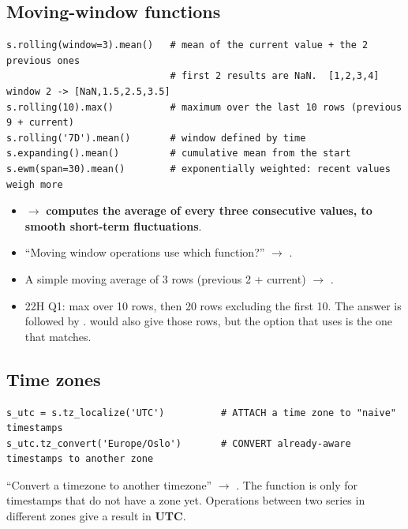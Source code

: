 \subsection{Moving-window functions}
\begin{codebox}
\begin{Verbatim}
s.rolling(window=3).mean()   # mean of the current value + the 2 previous ones
                             # first 2 results are NaN.  [1,2,3,4] window 2 -> [NaN,1.5,2.5,3.5]
s.rolling(10).max()          # maximum over the last 10 rows (previous 9 + current)
s.rolling('7D').mean()       # window defined by time
s.expanding().mean()         # cumulative mean from the start
s.ewm(span=30).mean()        # exponentially weighted: recent values weigh more
\end{Verbatim}
\end{codebox}
\begin{exam}
\begin{itemize}
  \item {} $\to$ \textbf{computes the average of every three consecutive values, to smooth short-term fluctuations}.
  \item ``Moving window operations use which function?'' $\to$ .
  \item A simple moving average of 3 rows (previous 2 + current) $\to$ .
  \item 22H Q1: max over 10 rows, then 20 rows excluding the first 10. The answer is  followed by .  would also give those rows, but the option that uses  is the one that matches.
\end{itemize}
\end{exam}

\subsection{Time zones}
\begin{codebox}
\begin{Verbatim}
s_utc = s.tz_localize('UTC')          # ATTACH a time zone to "naive" timestamps
s_utc.tz_convert('Europe/Oslo')       # CONVERT already-aware timestamps to another zone
\end{Verbatim}
\end{codebox}
``Convert a timezone to another timezone'' $\to$ . The function  is only for timestamps that do not have a zone yet.
Operations between two series in different zones give a result in \textbf{UTC}.
